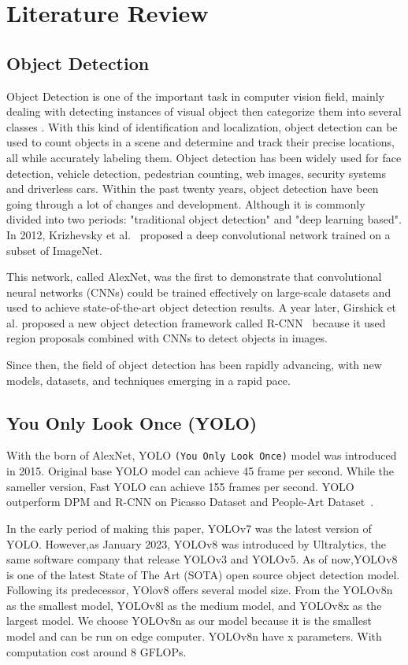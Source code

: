 \documentclass[conference]{IEEEtran}
\begin{document}
\section{Literature Review}

\subsection{Object Detection}
Object Detection is one of the important task in computer vision field, mainly dealing with detecting instances of visual object then categorize them into several classes \cite{b2}.
With this kind of identification and localization, object detection can be used to count objects in a scene and determine and track their precise locations, all while accurately labeling them.
Object detection has been widely used for face detection, vehicle detection, pedestrian counting, web images, security systems and driverless cars.
Within the past twenty years, object detection have been going through a lot of changes and development. Although it is commonly divided into two periods: "traditional object detection" and "deep learning based". In 2012, Krizhevsky et al.~\cite{b3} proposed a deep convolutional network trained on a subset of ImageNet. 

This network, called AlexNet, was the first to demonstrate that convolutional neural networks (CNNs) could be trained effectively on large-scale datasets and used to achieve state-of-the-art object detection results.
A year later, Girshick et al. \@ proposed a new object detection framework called R-CNN~\cite{b4} because it used region proposals combined with CNNs to detect objects in images.

Since then, the field of object detection has been rapidly advancing, with new models, datasets, and techniques emerging in a rapid pace. 

\subsection{You Only Look Once (YOLO)}
With the born of AlexNet, YOLO \verb|(You Only Look Once)| model was introduced in 2015. Original base YOLO model can achieve 45 frame per second.
While the sameller version, Fast YOLO can achieve 155 frames per second.
YOLO outperform DPM and R-CNN on Picasso Dataset and People-Art Dataset~\cite{You Only Look Once}.

In the early period of making this paper, YOLOv7 was the latest version of YOLO\@.
However,as January 2023, YOLOv8 was introduced by Ultralytics, the same software company that release YOLOv3 and YOLOv5. 
As of now,YOLOv8 is one of the latest State of The Art (SOTA) open source object detection model. Following its predecessor, YOlov8 offers several model size.
From the YOLOv8n as the smallest model, YOLOv8l as the medium model, and YOLOv8x as the largest model.
We choose YOLOv8n as our model because it is the smallest model and can be run on edge computer.
YOLOv8n have x parameters. With computation cost around 8 GFLOPs.
\end{document}
